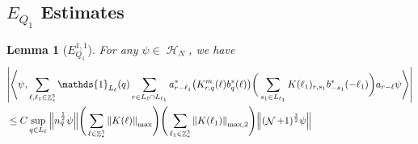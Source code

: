 \documentclass[sn-mathphys, Numbered ,a4paper]{sn-jnl}%
\DeclareMathOperator{\Z}{\mathbb{Z}}
\DeclareMathOperator{\HH}{\mathcal{H}}
\DeclareMathOperator{\NN}{\mathcal{N}}
\newcommand{\half}{\frac{1}{2}}
\newcommand{\eva}[1]{\left\langle #1 \right\rangle}
\theoremstyle{plain}
\newtheorem{lemma}[theorem]{Lemma}
\theoremstyle{definition}
\theoremstyle{remark}
\theoremstyle{plain}
\theoremstyle{definition}
\theoremstyle{remark}
\begin{document}
 \subsection{$E_{Q_1}$ Estimates}
\begin{lemma}[$E_{Q_1}^{1,1}$]
For any $\psi \in \HH_N$, we have
\begin{align}
     &\abs{\eva{\psi,\sum\limits_{\ell,\ell_1 \in \Z^3_*} \mathds{1}_{L_\ell}(q) \sum\limits_{r \in L_\ell \cap L_{\ell_1}}a^*_{r-\ell_1} 
     \big(K^{m}_{r,q}(\ell)b^*_{q}(\ell)\big) \bigg( \sum\limits_{s_1 \in L_{\ell_1}} K(\ell_1)_{r,s_1}b^*_{-s_1}(-\ell_1) \bigg) a_{r-\ell} \psi }}\nonumber\\
     &\leq  C \sup\limits_{q \in L_\ell} \norm{n_{q}^{\half} \psi} \Bigg(\sum\limits_{\ell \in \Z^3_*} \norm{K(\ell)}_{\mathrm{max}}\Bigg)\Bigg( \sum\limits_{\ell_1 \in \Z^3_*}\norm{K(\ell_1)}_{\mathrm{max},2} \Bigg)  \norm { (\NN+1)^{\frac{3}{2}} \psi } \label{eq:estEQ111}
\end{align}
\end{lemma}
\end{document}
